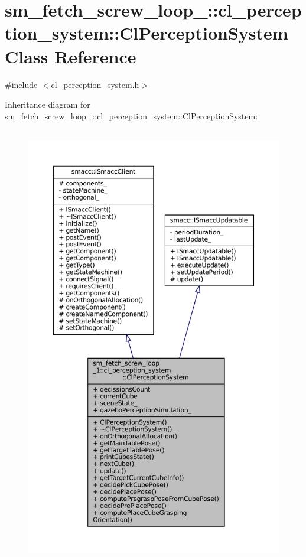 \hypertarget{classsm__fetch__screw__loop__1_1_1cl__perception__system_1_1ClPerceptionSystem}{}\section{sm\+\_\+fetch\+\_\+screw\+\_\+loop\+\_\+:\+:cl\+\_\+perception\+\_\+system\+:\+:Cl\+Perception\+System Class Reference}
\label{classsm__fetch__screw__loop__1_1_1cl__perception__system_1_1ClPerceptionSystem}


{\ttfamily \#include $<$cl\+\_\+perception\+\_\+system.\+h$>$}



Inheritance diagram for sm\+\_\+fetch\+\_\+screw\+\_\+loop\+\_\+:\+:cl\+\_\+perception\+\_\+system\+:\+:Cl\+Perception\+System\+:
\nopagebreak
\begin{figure}[H]
\begin{center}
\leavevmode
\includegraphics[height=550pt]{classsm__fetch__screw__loop__1_1_1cl__perception__system_1_1ClPerceptionSystem__inherit__graph}
\end{center}
\end{figure}


